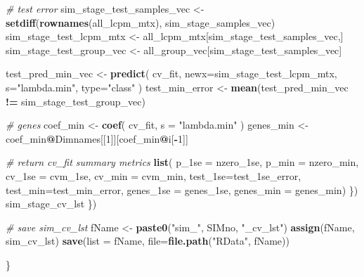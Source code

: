 \documentclass[
]{book}
\newenvironment{Shaded}{\begin{snugshade}}{\end{snugshade}}
\newcommand{\CommentTok}[1]{\textcolor[rgb]{0.56,0.35,0.01}{\textit{#1}}}
\newcommand{\DataTypeTok}[1]{\textcolor[rgb]{0.13,0.29,0.53}{#1}}
\newcommand{\DecValTok}[1]{\textcolor[rgb]{0.00,0.00,0.81}{#1}}
\newcommand{\KeywordTok}[1]{\textcolor[rgb]{0.13,0.29,0.53}{\textbf{#1}}}
\newcommand{\NormalTok}[1]{#1}
\newcommand{\OperatorTok}[1]{\textcolor[rgb]{0.81,0.36,0.00}{\textbf{#1}}}
\newcommand{\StringTok}[1]{\textcolor[rgb]{0.31,0.60,0.02}{#1}}
\begin{document}
\begin{Shaded}
\begin{Highlighting}[]
      \CommentTok{\# test error}
\NormalTok{      sim\_stage\_test\_samples\_vec <{-}}\StringTok{ }\KeywordTok{setdiff}\NormalTok{(}\KeywordTok{rownames}\NormalTok{(all\_lcpm\_mtx), sim\_stage\_samples\_vec)}
\NormalTok{      sim\_stage\_test\_lcpm\_mtx <{-}}\StringTok{ }\NormalTok{all\_lcpm\_mtx[sim\_stage\_test\_samples\_vec,]}
\NormalTok{      sim\_stage\_test\_group\_vec <{-}}\StringTok{ }\NormalTok{all\_group\_vec[sim\_stage\_test\_samples\_vec]}

\NormalTok{      test\_pred\_min\_vec <{-}}\StringTok{ }\KeywordTok{predict}\NormalTok{(}
\NormalTok{       cv\_fit,}
       \DataTypeTok{newx=}\NormalTok{sim\_stage\_test\_lcpm\_mtx,}
       \DataTypeTok{s=}\StringTok{"lambda.min"}\NormalTok{,}
       \DataTypeTok{type=}\StringTok{"class"}
\NormalTok{      )}
\NormalTok{      test\_min\_error <{-}}\StringTok{ }\KeywordTok{mean}\NormalTok{(test\_pred\_min\_vec }\OperatorTok{!=}\StringTok{ }\NormalTok{sim\_stage\_test\_group\_vec)}

      \CommentTok{\# genes}
\NormalTok{      coef\_min <{-}}\StringTok{ }\KeywordTok{coef}\NormalTok{(}
\NormalTok{        cv\_fit,}
        \DataTypeTok{s =} \StringTok{"lambda.min"}
\NormalTok{      )}
\NormalTok{      genes\_min <{-}}\StringTok{ }\NormalTok{coef\_min}\OperatorTok{@}\NormalTok{Dimnames[[}\DecValTok{1}\NormalTok{]][coef\_min}\OperatorTok{@}\NormalTok{i[}\OperatorTok{{-}}\DecValTok{1}\NormalTok{]]}

      \CommentTok{\# return cv\_fit summary metrics}
      \KeywordTok{list}\NormalTok{(}
       \DataTypeTok{p\_1se =}\NormalTok{ nzero\_1se, }
       \DataTypeTok{p\_min =}\NormalTok{ nzero\_min, }
       \DataTypeTok{cv\_1se =}\NormalTok{ cvm\_1se, }
       \DataTypeTok{cv\_min =}\NormalTok{ cvm\_min, }
       \DataTypeTok{test\_1se=}\NormalTok{test\_1se\_error, }
       \DataTypeTok{test\_min=}\NormalTok{test\_min\_error, }
       \DataTypeTok{genes\_1se =}\NormalTok{ genes\_1se,}
       \DataTypeTok{genes\_min =}\NormalTok{ genes\_min)}
\NormalTok{    \})}
\NormalTok{    sim\_stage\_cv\_lst}
\NormalTok{  \})}

  \CommentTok{\# save  sim\_cv\_lst}
\NormalTok{  fName <{-}}\StringTok{ }\KeywordTok{paste0}\NormalTok{(}\StringTok{"sim\_"}\NormalTok{, SIMno, }\StringTok{"\_cv\_lst"}\NormalTok{)}
  \KeywordTok{assign}\NormalTok{(fName, sim\_cv\_lst)}
  \KeywordTok{save}\NormalTok{(}\DataTypeTok{list =}\NormalTok{ fName, }\DataTypeTok{file=}\KeywordTok{file.path}\NormalTok{(}\StringTok{"RData"}\NormalTok{, fName))}

\NormalTok{\}}
\end{Highlighting}
\end{Shaded}
\end{document}
